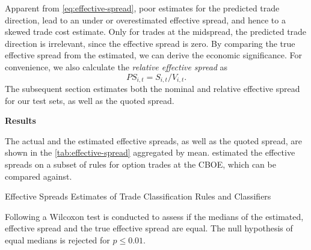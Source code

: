 Apparent from \cref{eq:effective-spread}, poor estimates for the predicted trade direction, lead to an under or overestimated effective spread, and hence to a skewed trade cost estimate. Only for trades at the midspread, the predicted trade direction is irrelevant, since the effective spread is zero. By comparing the true effective spread from the estimated, we can derive the economic significance. For convenience, we also calculate the \emph{relative effective spread} as
\begin{equation}
    {PS}_{i,t} = S_{i,t} / V_{i,t}.
\end{equation}
The subsequent section estimates both the nominal and relative effective spread for our test sets, as well as the quoted spread.

\textbf{Results}

The actual and the estimated effective spreads, as well as the quoted spread, are shown in the \cref{tab:effective-spread} aggregated by mean. \textcite[][896--897]{savickasInferringDirectionOption2003} estimated the effective spreads on a subset of rules for option trades at the \gls{CBOE}, which can be compared against.

\begin{table}[H]
    \centering
    
    \caption{Effective Spreads Estimates of Trade Classification Rules and Classifiers}
    \label{tab:effective-spread}
\end{table}

Following \textcite[][12]{theissenTestAccuracyLee2000} a Wilcoxon test is conducted to assess if the medians of the estimated, effective spread and the true effective spread are equal. The null hypothesis of equal medians is rejected for $p \leq 0.01$.


